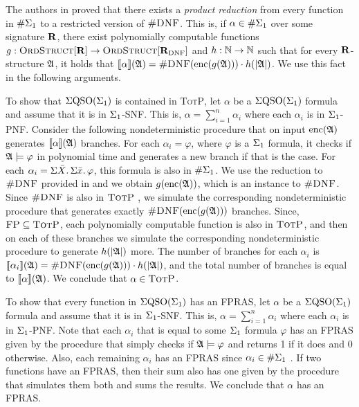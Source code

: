 The authors in \cite{SalujaST95} proved that there exists a {\em product reduction} from every function in $\#\Sigma_{1}$ to a restricted version of $\textsc{\#DNF}$. 
This is, if $\alpha\in\#\Sigma_{1}$ over some signature $\mathbf{R}$, there exist polynomially computable functions $g:\text{\sc OrdStruct}[\mathbf{R}]\to\text{\sc OrdStruct}[\mathbf{R}_{\text{DNF}}]$ and $h:\mathbb{N}\to\mathbb{N}$ such that for every $\mathbf{R}$-structure $\mathfrak{A}$, it holds that ${\llbracket{}{\alpha}\rrbracket}(\mathfrak{A}) = \textsc{\#DNF}({\rm enc}(g(\mathfrak{A})))\cdot h(\vert \mathfrak{A} \vert)$. We use this fact in the following arguments. 

To show that $\Sigma{\rm QSO}(\Sigma_{1})$ is contained  in \textsc{TotP}, let $\alpha$ be a $\Sigma{\rm QSO}(\Sigma_{1})$ formula and assume that it is in $\Sigma_{1}$-SNF. 
This is, $\alpha = \sum_{i = 1}^n\alpha_i$ where each $\alpha_i$ is in $\Sigma_{1}$-PNF. 
Consider the following nondeterministic procedure that on input ${\rm enc}(\mathfrak{A})$ generates ${\llbracket{}{\alpha}\rrbracket}(\mathfrak{A})$ branches. 
For each $\alpha_i = \varphi$, where $\varphi$ is a $\Sigma_{1}$ formula, it checks if $\mathfrak{A}\models\varphi$ in polynomial time and generates a new branch if that is the case. 
For each $\alpha_i = \Sigma{\bar{X}}.\,\Sigma{\bar{x}}.\,\varphi$, this formula is also in $\#\Sigma_{1}$. 
We use the reduction to $\textsc{\#DNF}$ provided in \cite{SalujaST95} and we obtain $g({\rm enc}(\mathfrak{A}))$, which is an instance to $\textsc{\#DNF}$. 
Since $\textsc{\#DNF}$ is also in $\text{\sc TotP}$ \cite{PagourtzisZ06}, we simulate the corresponding nondeterministic procedure that generates exactly $\textsc{\#DNF}({\rm enc}(g(\mathfrak{A})))$ branches. 
Since, $\text{\sc FP}\subseteq\text{\sc TotP}$\cite{PagourtzisZ06}, each polynomially computable function is also in $\text{\sc TotP}$, and then on each of these branches we simulate the corresponding nondeterministic procedure to generate $h(\vert \mathfrak{A} \vert)$ more. 
The number of branches for each $\alpha_i$ is ${\llbracket{}{\alpha_i}\rrbracket}(\mathfrak{A}) = \textsc{\#DNF}({\rm enc}(g(\mathfrak{A})))\cdot h(\vert \mathfrak{A} \vert)$, and the total number of branches is equal to ${\llbracket{}{\alpha}\rrbracket}(\mathfrak{A})$. 
We conclude that $\alpha\in\text{\sc TotP}$.

To show that every function in $\Sigma{\rm QSO}(\Sigma_{1})$ has an FPRAS,  let $\alpha$ be a $\Sigma{\rm QSO}(\Sigma_{1})$ formula and assume that it is in $\Sigma_{1}$-SNF. 
This is, $\alpha = \sum_{i = 1}^n\alpha_i$ where each $\alpha_i$ is in $\Sigma_{1}$-PNF. 
Note that each $\alpha_i$ that is equal to some $\Sigma_{1}$ formula $\varphi$ has an FPRAS given by the procedure that simply checks if $\mathfrak{A}\models\varphi$ and returns 1 if it does and 0 otherwise. 
Also, each remaining $\alpha_i$ has an FPRAS since $\alpha_i\in \#\Sigma_{1}$ \cite{SalujaST95}. 
If two functions have an FPRAS, then their sum also has one given by the procedure that simulates them both and sums the results. 
We conclude that $\alpha$ has an FPRAS.

